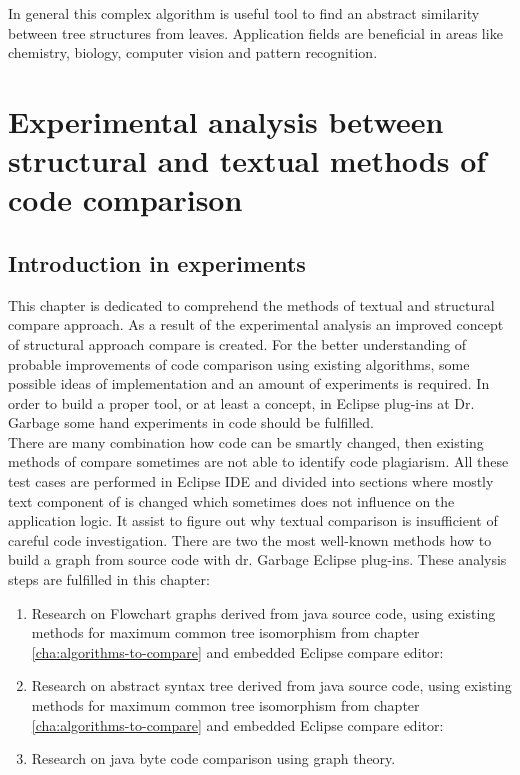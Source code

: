 \documentclass{report}
\begin{document}
In general this complex algorithm is useful tool to find an abstract similarity between tree structures from leaves. Application fields are beneficial in areas like chemistry, biology, computer vision and pattern recognition. 



\chapter{Experimental analysis between structural and textual methods of code comparison}
\label{cha:experimental}
\section{Introduction in experiments}

This chapter is dedicated to comprehend the methods of textual and structural compare approach. As a result of the experimental analysis an improved concept of structural approach compare  is created. For the better understanding of probable improvements of code comparison using existing algorithms, some possible ideas of implementation and an amount of experiments is required. In order to build a proper tool, or at least a concept, in Eclipse plug-ins at Dr. Garbage some hand experiments in code should be fulfilled. 
\\
There are many combination how code can be smartly changed, then existing methods of compare sometimes are not able to identify code plagiarism.  All these test cases are performed in Eclipse IDE \cite{eclipse_site} and divided into sections where mostly text component of is changed which sometimes does not influence on the application logic. It assist to figure out why textual comparison is insufficient of careful code investigation. There are two the most well-known methods how to build a graph from source code with dr. Garbage Eclipse plug-ins. These analysis steps are fulfilled in this chapter:
\begin{enumerate}
  \item Research on Flowchart graphs derived from java source code, using existing methods for maximum common tree isomorphism from chapter \ref{cha:algorithms-to-compare} and embedded Eclipse compare editor:	
  
  \item Research on abstract syntax tree derived from java source code, using existing methods for maximum common tree isomorphism from chapter \ref{cha:algorithms-to-compare} and embedded Eclipse compare editor:	
  
  \item Research on java byte code comparison using graph theory.
\end{enumerate}
\end{document}
